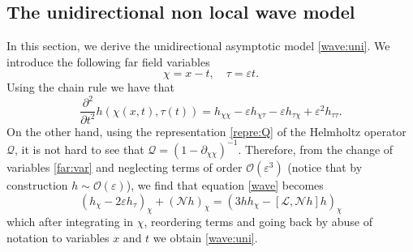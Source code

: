 \documentclass[final,11pt,a4paper,reqno]{amsart}
\theoremstyle{definition}
\begin{document}
\subsection{The unidirectional non local wave model}
In this section, we derive  the unidirectional asymptotic model  \eqref{wave:uni}. We introduce the following far field variables
\begin{equation}\label{far:var}
\chi=x-t, \quad \tau=\varepsilon t.
\end{equation}
Using the chain rule we have that
\begin{equation*}
\frac{\partial^{2}}{\partial t^{2}}h(\chi(x,t),\tau(t))=h_{\chi\chi}-\varepsilon h_{\chi\tau}-\varepsilon h_{\tau\chi}+\varepsilon^{2}h_{\tau\tau}.
\end{equation*}
On the other hand, using the representation \eqref{repre:Q} of the Helmholtz operator $\mathscr{Q}$, it is not hard to see that
$\mathscr{Q}=(1-\partial_{\chi \chi})^{-1}.$
Therefore, from the change of variables \eqref{far:var} and neglecting terms of order $\mathcal{O}(\varepsilon^3)$ (notice that by construction $h\sim \mathcal{O}(\varepsilon)$), we find that equation \eqref{wave} becomes
\begin{equation*}
\left(h_{\chi}-2\varepsilon h_{\tau}\right)_{\chi}+(\mathscr{N}h)_{\chi}=\left( 3 h h_{\chi}-[\mathscr{L},\mathscr{N}h]h\right)_{\chi}
\end{equation*}
which after integrating in $\chi$, reordering terms and going back by abuse of notation to  variables $x$ and $t$ we obtain \eqref{wave:uni}.
\end{document}

